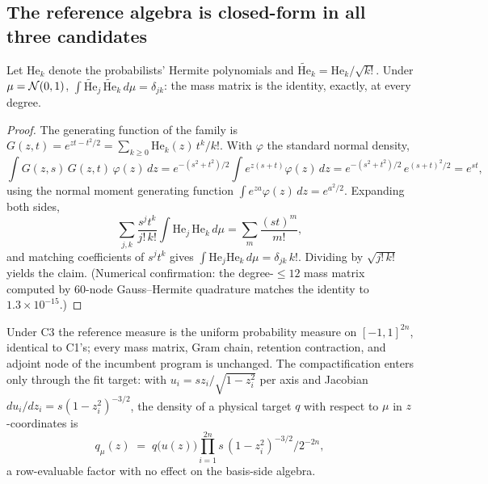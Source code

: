 \subsection{The reference algebra is closed-form in all three candidates}

\begin{proposition}
\label{prop:bf-hd-hermite-mass-identity}
Let \(\mathrm{He}_k\) denote the probabilists' Hermite polynomials and
\(\widetilde{\mathrm{He}}_k=\mathrm{He}_k/\sqrt{k!}\).  Under
\(\mu=\mathcal{N}(0,1)\),
\(\int \widetilde{\mathrm{He}}_j\,\widetilde{\mathrm{He}}_k\,d\mu
 =\delta_{jk}\): the mass matrix is the identity, exactly, at every
degree.
\end{proposition}

\begin{proof}
The generating function of the family is
\(G(z,t)=e^{zt-t^2/2}=\sum_{k\ge0}\mathrm{He}_k(z)\,t^k/k!\).
With \(\varphi\) the standard normal density,
\[
  \int G(z,s)\,G(z,t)\,\varphi(z)\,dz
  =e^{-(s^2+t^2)/2}\int e^{z(s+t)}\varphi(z)\,dz
  =e^{-(s^2+t^2)/2}\,e^{(s+t)^2/2}
  =e^{st},
\]
using the normal moment generating function
\(\int e^{za}\varphi(z)\,dz=e^{a^2/2}\).  Expanding both sides,
\[
  \sum_{j,k}\frac{s^j t^k}{j!\,k!}
  \int \mathrm{He}_j\,\mathrm{He}_k\,d\mu
  =\sum_{m}\frac{(st)^m}{m!},
\]
and matching coefficients of \(s^j t^k\) gives
\(\int \mathrm{He}_j \mathrm{He}_k\,d\mu=\delta_{jk}\,k!\).  Dividing by
\(\sqrt{j!\,k!}\) yields the claim.  (Numerical confirmation: the
degree-\(\le12\) mass matrix computed by 60-node Gauss--Hermite
quadrature matches the identity to \(1.3\times10^{-15}\).)
\end{proof}

\begin{proposition}
\label{prop:bf-hd-c3-algebra}
Under C3 the reference measure is the uniform probability measure on
\([-1,1]^{2n}\), identical to C1's; every mass matrix, Gram chain,
retention contraction, and adjoint node of the incumbent program is
unchanged.  The compactification enters only through the fit target: with
\(u_i=s z_i/\sqrt{1-z_i^2}\) per axis and Jacobian
\(du_i/dz_i=s(1-z_i^2)^{-3/2}\), the density of a physical target \(q\)
with respect to \(\mu\) in \(z\)-coordinates is
\begin{equation}
  q_\mu(z)\;=\;q\bigl(u(z)\bigr)\prod_{i=1}^{2n}
  s\,(1-z_i^2)^{-3/2}\Big/ 2^{-2n},
  \label{eq:bf-hd-c3-target}
\end{equation}
a row-evaluable factor with no effect on the basis-side algebra.
\end{proposition}


